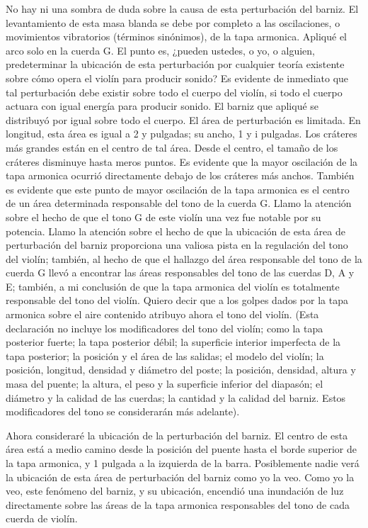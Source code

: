 \documentclass[12pt]{book}
\begin{document}
No hay ni una sombra de duda sobre la causa de esta perturbación del barniz. El levantamiento de esta masa blanda se debe por completo a las oscilaciones, o movimientos vibratorios (términos sinónimos), de la tapa armonica. Apliqué el arco solo en la cuerda G. El punto es, ¿pueden ustedes, o yo, o alguien, predeterminar la ubicación de esta perturbación por cualquier teoría existente sobre cómo opera el violín para producir sonido? Es evidente de inmediato que tal perturbación debe existir sobre todo el cuerpo del violín, si todo el cuerpo actuara con igual energía para producir sonido. El barniz que apliqué se distribuyó por igual sobre todo el cuerpo. El área de perturbación es limitada. En longitud, esta área es igual a 2 y pulgadas; su ancho, 1 y i pulgadas. Los cráteres más grandes están en el centro de tal área. Desde el centro, el tamaño de los cráteres disminuye hasta meros puntos. Es evidente que la mayor oscilación de la tapa armonica ocurrió directamente debajo de los cráteres más anchos. También es evidente que este punto de mayor oscilación de la tapa armonica es el centro de un área determinada responsable del tono de la cuerda G. Llamo la atención sobre el hecho de que el tono G de este violín una vez fue notable por su potencia. Llamo la atención sobre el hecho de que la ubicación de esta área de perturbación del barniz proporciona una valiosa pista en la regulación del tono del violín; también, al hecho de que el hallazgo del área responsable del tono de la cuerda G llevó a encontrar las áreas responsables del tono de las cuerdas D, A y E; también, a mi conclusión de que la tapa armonica del violín es totalmente responsable del tono del violín. Quiero decir que a los golpes dados por la tapa armonica sobre el aire contenido atribuyo ahora el tono del violín. (Esta declaración no incluye los modificadores del tono del violín; como la tapa posterior fuerte; la tapa posterior débil; la superficie interior imperfecta de la tapa posterior; la posición y el área de las salidas; el modelo del violín; la posición, longitud, densidad y diámetro del poste; la posición, densidad, altura y masa del puente; la altura, el peso y la superficie inferior del diapasón; el diámetro y la calidad de las cuerdas; la cantidad y la calidad del barniz. Estos modificadores del tono se considerarán más adelante).

Ahora consideraré la ubicación de la perturbación del barniz. El centro de esta área está a medio camino desde la posición del puente hasta el borde superior de la tapa armonica, y 1 pulgada a la izquierda de la barra. Posiblemente nadie verá la ubicación de esta área de perturbación del barniz como yo la veo. Como yo la veo, este fenómeno del barniz, y su ubicación, encendió una inundación de luz directamente sobre las áreas de la tapa armonica responsables del tono de cada cuerda de violín.
\end{document}
